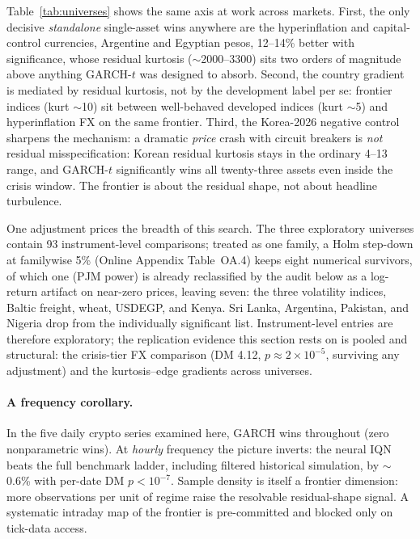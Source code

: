 \documentclass[11pt]{article}
\theoremstyle{remark}
\begin{document}
Table~\ref{tab:universes} shows the same axis at work across markets.
First, the only decisive
\emph{standalone} single-asset wins anywhere are the hyperinflation and capital-control currencies, Argentine and Egyptian pesos, 12--14\%
better with significance, whose residual kurtosis ($\sim$2000--3300)
sits two orders of magnitude above anything GARCH-$t$ was designed to
absorb. Second, the country gradient is mediated by residual kurtosis,
not by the development label per se: frontier indices (kurt $\sim$10)
sit between well-behaved developed indices (kurt $\sim$5) and
hyperinflation FX on the same frontier. Third, the Korea-2026 negative
control sharpens the mechanism: a dramatic \emph{price} crash with
circuit breakers is \emph{not} residual misspecification: Korean residual kurtosis stays in the ordinary 4--13 range, and GARCH-$t$
significantly wins all twenty-three assets even inside the crisis
window. The frontier is about the residual shape, not about headline
turbulence.

One adjustment prices the breadth of this search. The three
exploratory universes contain 93 instrument-level comparisons; treated
as one family, a Holm step-down at familywise 5\% (Online Appendix
Table~OA.4) keeps eight numerical survivors, of which one (PJM power)
is already reclassified by the audit below as a log-return artifact on
near-zero prices, leaving seven: the three volatility indices, Baltic
freight, wheat, USDEGP, and Kenya. Sri Lanka, Argentina, Pakistan, and
Nigeria drop from the individually significant list. Instrument-level
entries are therefore exploratory; the replication evidence this
section rests on is pooled and structural: the crisis-tier FX
comparison (DM 4.12, $p\approx2\times10^{-5}$, surviving any
adjustment) and the kurtosis--edge gradients across universes.

\paragraph{A frequency corollary.} In the five daily crypto series examined here, GARCH wins throughout (zero
nonparametric wins). At \emph{hourly} frequency the
picture inverts: the neural IQN beats the full benchmark ladder,
including filtered historical simulation, by $\sim$0.6\% with per-date
DM $p < 10^{-7}$. Sample density is itself a frontier dimension: more
observations per unit of regime raise the resolvable residual-shape
signal. A systematic intraday map of the frontier is pre-committed and
blocked only on tick-data access.
\end{document}
